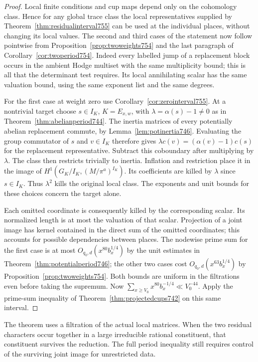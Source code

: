 \documentclass[a4paper,11pt]{article}
\theoremstyle{definition}
\theoremstyle{remark}
\numberwithin{equation}{section}
\begin{document}
\begin{proof}
Local finite conditions and cup maps depend only on the
cohomology class. Hence for any global trace class the
local representatives supplied by
Theorem~\ref{thm:residualinterval755} can be used at the
individual places, without changing its local values.
The second and third cases of the statement now follow
pointwise from Proposition~\ref{prop:twoweights754} and the
last paragraph of Corollary~\ref{cor:twoperiod754}. Indeed
every labelled jump of a replacement block occurs in the
ambient Hodge multiset with the same multiplicity bound; this
is all that the determinant test requires. Its local
annihilating scalar has the same valuation bound, using the
same exponent list and the same degrees.

For the first case at weight zero use
Corollary~\ref{cor:zerointerval755}. At a nontrivial target
choose \(s\in I_K\), \(K=E_{x,w}\), with
\(\lambda=\alpha(s)-1\ne0\) as in
Theorem~\ref{thm:abelianperiod744}. The inertia matrices of
every potentially abelian replacement commute, by
Lemma~\ref{lem:potinertia746}. Evaluating the group commutator
of \(s\) and \(v\in I_K\) therefore gives
\(\lambda c(v)=(\alpha(v)-1)c(s)\) for the replacement
representative. Subtract this coboundary after multiplying by
\(\lambda\). The class then restricts trivially to inertia.
Inflation and restriction place it in the image of
\(H^1(G_K/I_K,(M/\pi^a)^{I_K})\). Its coefficients are killed
by \(\lambda\) since \(s\in I_K\). Thus \(\lambda^2\) kills
the original local class. The exponents and unit bounds for
these choices concern the target alone.

Each omitted coordinate is consequently killed by the
corresponding scalar. Its normalized length is at most the
valuation of that scalar. Projection of a joint image has
kernel contained in the direct sum of the omitted coordinates;
this accounts for possible dependencies between places.
The nodewise prime sum for the first case is at most
\(O_{q_0,d}(x^{80}b_x^{1/4})\) by the unit estimates in
Theorem~\ref{thm:potentialperiod746}; the other two cases
cost \(O_{q_0,d}(x^{63}b_x^{1/4})\) by
Proposition~\ref{prop:twoweights754}. Both bounds are uniform
in the filtrations even before taking the supremum. Now
\(\sum_{x\ge V_0} x^{80}b_x^{-1/4}\ll V_0^{-44}\).
Apply the prime-sum inequality of
Theorem~\ref{thm:projectedcups742} on this same interval.
\end{proof}
The theorem uses a filtration of the actual local matrices.
When the two residual characters occur together in a large
irreducible rational constituent, that constituent survives
the reduction. The full period inequality still requires
control of the surviving joint image for unrestricted data.
\clearpage
\end{document}
